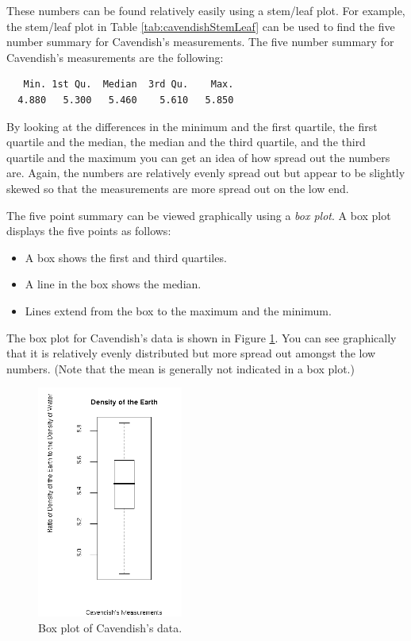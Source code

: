 \documentclass[12pt]{article}
\begin{document}
These numbers can be found relatively easily using a stem/leaf plot.
For example, the stem/leaf plot in Table \ref{tab:cavendishStemLeaf}
can be used to find the five number summary for Cavendish's
measurements.  The five number summary for Cavendish's measurements
are the following:
\begin{verbatim}
   Min. 1st Qu.  Median  3rd Qu.    Max. 
  4.880   5.300   5.460    5.610   5.850 
\end{verbatim}
By looking at the differences in the minimum
and the first quartile, the first quartile and the median, the median
and the third quartile, and the third quartile and the maximum you can
get an idea of how spread out the numbers are. Again, the numbers are
relatively evenly spread out but appear to be slightly skewed so that
the measurements are more spread out on the low end.

The five point summary can be viewed graphically using a \textit{box
  plot}. A box plot displays the five points as follows:
\begin{itemize}
\item A box shows the first and third quartiles.
\item A line in the box shows the median.
\item Lines extend from the box to the maximum and the minimum.
\end{itemize}
The box plot for Cavendish's data is shown in Figure
\ref{fig:cavBoxPlot}. You can see graphically that it is relatively
evenly distributed but more spread out amongst the low numbers.  (Note
that the mean is generally not indicated in a box plot.)

\begin{figure}[tb]
  \centerline{\includegraphics[height=3in]{cavBoxPlot}}
  \caption{Box plot of Cavendish's data.}
  \label{fig:cavBoxPlot}
\end{figure}
\end{document}
